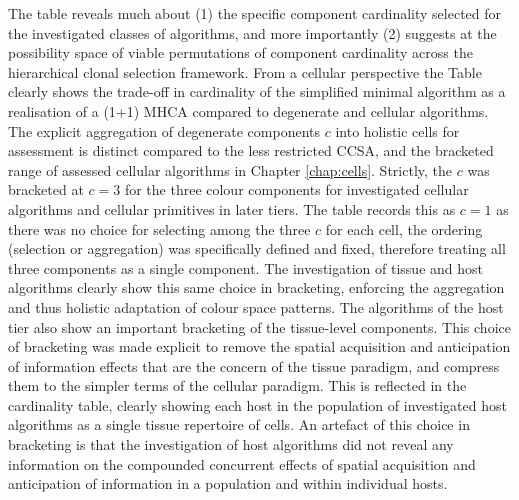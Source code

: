 The table reveals much about (1) the specific component cardinality selected for the investigated classes of algorithms, and more importantly (2) suggests at the possibility space of viable permutations of component cardinality across the hierarchical clonal selection framework.
From a cellular perspective the Table clearly shows the trade-off in cardinality of the simplified minimal algorithm as a realisation of a (1+1) MHCA compared to degenerate and cellular algorithms. The explicit aggregation of degenerate components $c$ into holistic cells for assessment is distinct compared to the less restricted CCSA, and the bracketed range of assessed cellular algorithms in Chapter \ref{chap:cells}. Strictly, the $c$ was bracketed at $c=3$ for the three colour components for investigated cellular algorithms and cellular primitives in later tiers. The table records this as $c=1$ as there was no choice for selecting among the three $c$ for each cell, the ordering (selection or aggregation) was specifically defined and fixed, therefore treating all three components as a single component. 
The investigation of tissue and host algorithms clearly show this same choice in bracketing, enforcing the aggregation and thus holistic adaptation of colour space patterns.
The algorithms of the host tier also show an important bracketing of the tissue-level components. This choice of bracketing was made explicit to remove the spatial acquisition and anticipation of information effects that are the concern of the tissue paradigm, and compress them to the simpler terms of the cellular paradigm. This is reflected in the cardinality table, clearly showing each host in the population of investigated host algorithms as a single tissue repertoire of cells. An artefact of this choice in bracketing is that the investigation of host algorithms did not reveal any information on the compounded concurrent effects of spatial acquisition and anticipation of information in a population and within individual hosts.

